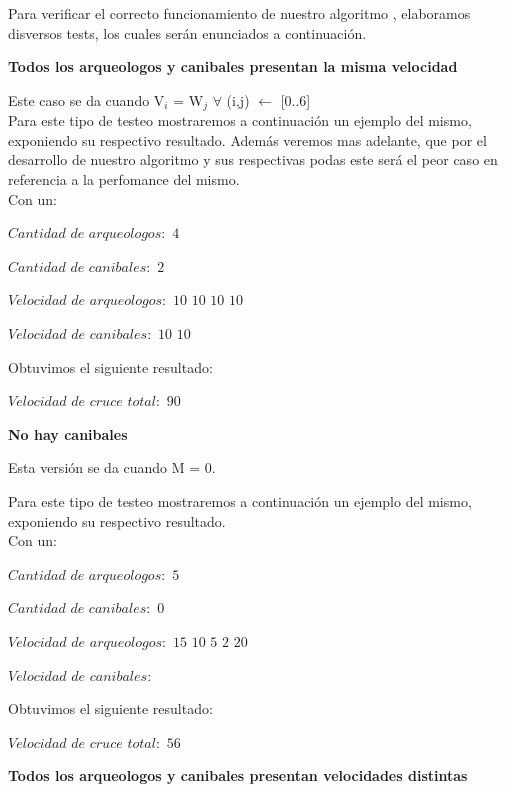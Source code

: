 \indent Para verificar el correcto funcionamiento de nuestro algoritmo , elaboramos disversos tests,
los cuales ser\'an enunciados a continuaci\'on.\\

\begin{center}
 \textbf{Todos los arqueologos y canibales presentan la misma velocidad}
\end{center}

Este caso se da cuando V$_{i}$ = W$_{j}$ $\forall$ (i,j)  $\gets$ [0..6] \\

 Para este tipo de testeo mostraremos a continuaci\'on un ejemplo del mismo, exponiendo su respectivo resultado. Adem\'as veremos mas adelante, que por el desarrollo de nuestro algoritmo y sus respectivas podas este ser\'a el peor caso en referencia a la perfomance del mismo.\\
 
 Con un:
 
$Cantidad$ $de$ $arqueologos:$ $4 $

$Cantidad$ $de$ $canibales:$ $2 $ 

$Velocidad$ $de$ $arqueologos:$ $10$ $10$ $10$ $10$

$Velocidad$ $de$ $canibales:$ $10$ $10 $

  Obtuvimos el siguiente resultado:

$Velocidad$ $de$ $cruce$ $total: $ $90$\\



 \begin{center}
 \textbf{No hay canibales}
\end{center}

Esta versi\'on se da cuando M = 0. 

Para este tipo de testeo mostraremos a continuaci\'on un ejemplo del mismo, exponiendo su respectivo resultado.\\

 Con un:

$Cantidad$ $de$ $arqueologos:$ $5 $  

$Cantidad$ $de$ $canibales:$ $0 $ 

$Velocidad$ $de$ $arqueologos:$ $15$ $10$ $5$ $2$ $20$ 

$Velocidad$ $de$ $canibales: $  

  Obtuvimos el siguiente resultado:

$Velocidad$ $de$ $cruce$ $total: $ $56$


\begin{center}
 \textbf{Todos los arqueologos y canibales presentan velocidades distintas}
\end{center}

